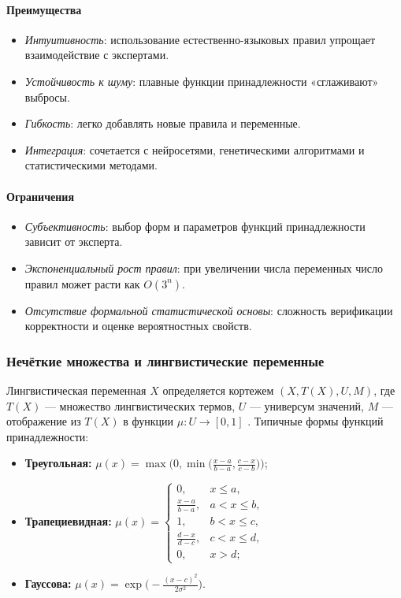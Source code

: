 \paragraph{Преимущества}
\begin{itemize}
  \item \textit{Интуитивность}: использование естественно-языковых правил упрощает взаимодействие с экспертами.
  \item \textit{Устойчивость к шуму}: плавные функции принадлежности «сглаживают» выбросы.
  \item \textit{Гибкость}: легко добавлять новые правила и переменные.
  \item \textit{Интеграция}: сочетается с нейросетями, генетическими алгоритмами и статистическими методами.
\end{itemize}

\paragraph{Ограничения}
\begin{itemize}
  \item \textit{Субъективность}: выбор форм и параметров функций принадлежности зависит от эксперта.
  \item \textit{Экспоненциальный рост правил}: при увеличении числа переменных число правил может расти как \(O(3^n)\).
  \item \textit{Отсутствие формальной статистической основы}: сложность верификации корректности и оценке вероятностных свойств.
\end{itemize}


\subsubsection{Нечёткие множества и лингвистические переменные}
Лингвистическая переменная \(X\) определяется кортежем \((X, T(X), U, M)\), где \(T(X)\) --- множество лингвистических термов, \(U\) --- универсум значений, \(M\) --- отображение из \(T(X)\) в функции \(\mu:U\to[0,1]\) \cite{Zadeh1975}. Типичные формы функций принадлежности:
\begin{itemize}
  \item \textbf{Треугольная:} 
    \(\mu(x) = \max\bigl(0, \min\bigl(\tfrac{x-a}{b-a}, \tfrac{c-x}{c-b}\bigr)\bigr)\);
  \item \textbf{Трапециевидная:}
    \(\mu(x) = \begin{cases}
      0, & x \le a,\\
      \tfrac{x-a}{b-a}, & a < x \le b,\\
      1, & b < x \le c,\\
      \tfrac{d-x}{d-c}, & c < x \le d,\\
      0, & x > d;
    \end{cases}\)
  \item \textbf{Гауссова:}
    \(\mu(x) = \exp\bigl(-\tfrac{(x-c)^2}{2\sigma^2}\bigr)\).
\end{itemize}

